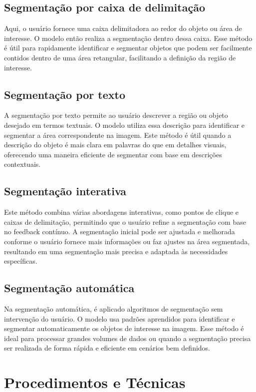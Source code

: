 \subsection{Segmentação por caixa de delimitação}
Aqui, o usuário fornece uma caixa delimitadora ao redor do objeto ou área de interesse. 
O modelo então realiza a segmentação dentro dessa caixa. 
Esse método é útil para rapidamente identificar e segmentar objetos que podem ser facilmente contidos dentro de uma área retangular, facilitando a definição da região de interesse.


\subsection{Segmentação por texto}
A segmentação por texto permite ao usuário descrever a região ou objeto desejado em termos textuais. 
O modelo utiliza essa descrição para identificar e segmentar a área correspondente na imagem. 
Este método é útil quando a descrição do objeto é mais clara em palavras do que em detalhes visuais, oferecendo uma maneira eficiente de segmentar com base em descrições contextuais.


\subsection{Segmentação interativa}
Este método combina várias abordagens interativas, como pontos de clique e caixas de delimitação, permitindo que o usuário refine a segmentação com base no feedback contínuo. 
A segmentação inicial pode ser ajustada e melhorada conforme o usuário fornece mais informações ou faz ajustes na área segmentada, resultando em uma segmentação mais precisa e adaptada às necessidades específicas.


\subsection{Segmentação automática}
Na segmentação automática, é aplicado algoritmos de segmentação sem intervenção do usuário. 
O modelo usa padrões aprendidos para identificar e segmentar automaticamente os objetos de interesse na imagem. 
Esse método é ideal para processar grandes volumes de dados ou quando a segmentação precisa ser realizada de forma rápida e eficiente em cenários bem definidos.

\section{Procedimentos e Técnicas}

